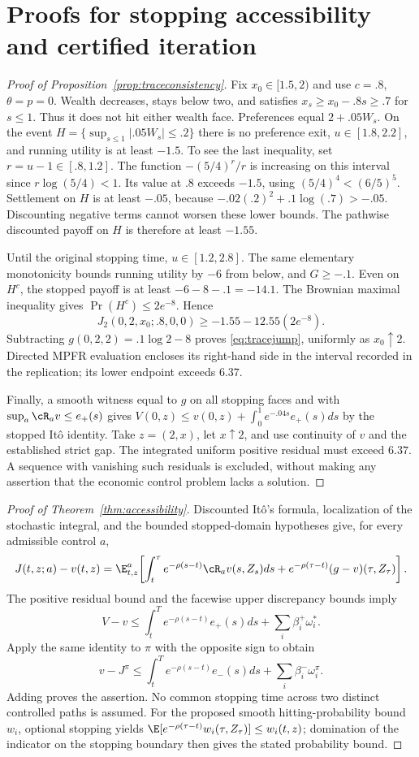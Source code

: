 \section{Proofs for stopping accessibility and certified iteration}\label{app:accessibility}
\begin{proof}[Proof of Proposition~\ref{prop:traceconsistency}]
Fix $x_0\in[1.5,2)$ and use $c=.8$, $\theta=p=0$. Wealth decreases, stays below two, and satisfies $x_s\geq x_0-.8s\geq.7$ for $s\leq1$. Thus it does not hit either wealth face. Preferences equal $2+.05W_s$. On the event $H=\{\sup_{s\leq1}|.05W_s|\leq.2\}$ there is no preference exit, $u\in[1.8,2.2]$, and running utility is at least $-1.5$. To see the last inequality, set $r=u-1\in[.8,1.2]$. The function $-(5/4)^r/r$ is increasing on this interval since $r\log(5/4)<1$. Its value at $.8$ exceeds $-1.5$, using $(5/4)^4<(6/5)^5$. Settlement on $H$ is at least $-.05$, because $-.02(.2)^2+.1\log(.7)>-.05$. Discounting negative terms cannot worsen these lower bounds. The pathwise discounted payoff on $H$ is therefore at least $-1.55$.

Until the original stopping time, $u\in[1.2,2.8]$. The same elementary monotonicity bounds running utility by $-6$ from below, and $G\geq-.1$. Even on $H^c$, the stopped payoff is at least $-6-8-.1=-14.1$. The Brownian maximal inequality gives $\Pr(H^c)\leq2e^{-8}$. Hence
\[
 J_2(0,2,x_0;.8,0,0)\geq-1.55-12.55(2e^{-8}).
\]
Subtracting $g(0,2,2)=.1\log2-8$ proves \eqref{eq:tracejump}, uniformly as $x_0\uparrow2$. Directed MPFR evaluation encloses its right-hand side in the interval recorded in the replication; its lower endpoint exceeds $6.37$.

Finally, a smooth witness equal to $g$ on all stopping faces and with $\sup_a\cR_av\leq e_+(s)$ gives $V(0,z)\leq v(0,z)+\int_0^1e^{-.04s}e_+(s)ds$ by the stopped It\^o identity. Take $z=(2,x)$, let $x\uparrow2$, and use continuity of $v$ and the established strict gap. The integrated uniform positive residual must exceed $6.37$. A sequence with vanishing such residuals is excluded, without making any assertion that the economic control problem lacks a solution.
\end{proof}

\begin{proof}[Proof of Theorem~\ref{thm:accessibility}]
Discounted It\^o's formula, localization of the stochastic integral, and the bounded stopped-domain hypotheses give, for every admissible control $a$,
\[
 J(t,z;a)-v(t,z)=\E_{t,z}^a\!\left[\int_t^\tau e^{-\rho(s-t)}\cR_av(s,Z_s)ds
 +e^{-\rho(\tau-t)}(g-v)(\tau,Z_\tau)\right].
\]
The positive residual bound and the facewise upper discrepancy bounds imply
\[
 V-v\leq\int_t^T e^{-\rho(s-t)}e_+(s)ds+\sum_i\beta_i^+\omega_i^*.
\]
Apply the same identity to $\pi$ with the opposite sign to obtain
\[
 v-J^\pi\leq\int_t^T e^{-\rho(s-t)}e_-(s)ds+\sum_i\beta_i^-\omega_i^\pi.
\]
Adding proves the assertion. No common stopping time across two distinct controlled paths is assumed. For the proposed smooth hitting-probability bound $w_i$, optional stopping yields $\E[e^{-\rho(\tau-t)}w_i(\tau,Z_\tau)]\leq w_i(t,z)$; domination of the indicator on the stopping boundary then gives the stated probability bound.
\end{proof}

